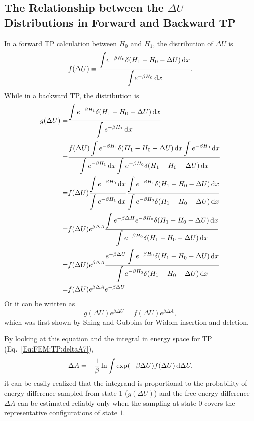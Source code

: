 \begin{appendices}
\chapter{The Relationship between the $\Delta U$ Distributions in Forward and Backward TP\label{chapter:Appendix:DeltaUDistributions}}
In a forward TP calculation between $H_0$ and $H_1$, the distribution of $\Delta U$ is
\begin{equation}
    f(\Delta U)=\frac{{\displaystyle\int} e^{-\beta H_0}\delta(H_1-H_0-\Delta U)\mathop{}\!\mathrm{d} x}{{\displaystyle\int} e^{-\beta H_0}\mathop{}\!\mathrm{d} x}.
\end{equation}
While in a backward TP, the distribution is
\begin{align}
    g(\Delta U)=&\frac{\displaystyle\int e^{-\beta H_1}\delta(H_1-H_0-\Delta U)\diff x}{\displaystyle\int e^{-\beta H_1}\diff x}\notag\\
               =&\frac{f(\Delta U)\displaystyle\int e^{-\beta H_1}\delta(H_1-H_0-\Delta U)\diff x\int e^{-\beta H_0}\diff x}{\displaystyle\int e^{-\beta H_1}\diff x\int e^{-\beta H_0}\delta(H_1-H_0-\Delta U)\diff x}\notag\\
               =&f(\Delta U)\frac{\displaystyle\int e^{-\beta H_0}\diff x }{\displaystyle\int e^{-\beta H_1}\diff x}\frac{\displaystyle\int e^{-\beta H_1}\delta(H_1-H_0-\Delta U)\diff x}{\displaystyle\int e^{-\beta H_0}\delta(H_1-H_0-\Delta U)\diff x}\notag\\
               =&f(\Delta U)e^{\beta\Delta A}\frac{\displaystyle\int e^{-\beta\Delta H}e^{-\beta H_0}\delta(H_1-H_0-\Delta U)\diff x}{\displaystyle\int e^{-\beta H_0}\delta(H_1-H_0-\Delta U)\diff x}\notag\\
               =&f(\Delta U)e^{\beta\Delta A}\frac{e^{-\beta\Delta U}\displaystyle\int e^{-\beta H_0}\delta(H_1-H_0-\Delta U)\diff x}{\displaystyle\int e^{-\beta H_0}\delta(H_1-H_0-\Delta U)\diff x}\notag\\
               =&f(\Delta U)e^{\beta\Delta A}e^{-\beta\Delta U}
\end{align}
Or it can be written as
\begin{equation}
    g(\Delta U)e^{\beta\Delta U}=f(\Delta U)e^{\beta\Delta A},
\end{equation}
which was first shown by Shing and Gubbins for Widom insertion and deletion\cite{ShingMolPhys1982}.

By looking at this equation and the integral in energy space for TP (Eq.~\ref{Eq:FEM:TP:deltaA7}), 
\begin{equation}
	\Delta A = -\frac{1}{\beta} \ln \int \exp(-\beta \Delta U) f(\Delta U) \mathop{}\!\mathrm{d}\Delta U,
\end{equation}
it can be easily realized that the integrand is proportional to the probability of energy difference sampled from state 1 ($g(\Delta U)$) and the free energy difference $\Delta A$ can be estimated reliably only when the sampling at state $0$ covers the representative configurations of state $1$.


\end{appendices}
